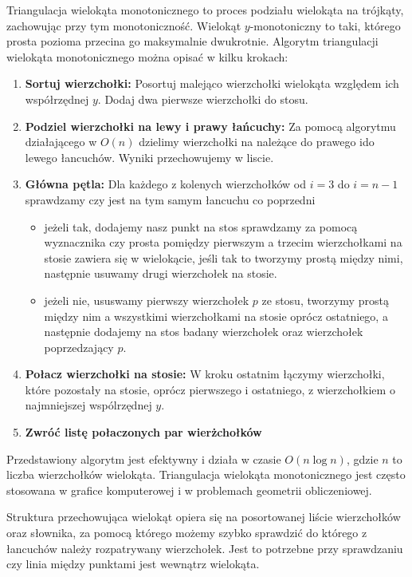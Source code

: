 \quad Triangulacja wielokąta monotonicznego to proces podziału wielokąta na trójkąty, zachowując przy tym monotoniczność. Wielokąt $y$-monotoniczny to taki, którego prosta pozioma przecina go maksymalnie dwukrotnie. Algorytm triangulacji wielokąta monotonicznego można opisać w kilku krokach:

\begin{enumerate}
\item \textbf{Sortuj wierzchołki:} Posortuj malejąco wierzchołki wielokąta względem ich współrzędnej $y$. Dodaj dwa pierwsze wierzchołki do stosu.

\item \textbf{Podziel wierzchołki na lewy i prawy łańcuchy:} Za pomocą algorytmu działającego w $O(n)$ dzielimy wierzchołki na należące do prawego ido lewego łancuchów. 
Wyniki przechowujemy w liscie.

\item \textbf{Główna pętla:} Dla każdego z kolenych wierzchołków od $i = 3$ do $i = n-1$ sprawdzamy czy jest na tym samym łancuchu co poprzedni

\begin{itemize}
    \item jeżeli tak, 
    dodajemy nasz punkt na stos
    sprawdzamy za pomocą wyznacznika czy prosta pomiędzy pierwszym a trzecim wierzchołkami na stosie zawiera się w wielokącie, jeśli tak to tworzymy prostą między nimi, następnie usuwamy drugi wierzchołek na stosie.
    
    
    \item jeżeli nie, 
    ususwamy pierwszy wierzchołek $p$ ze stosu,
    tworzymy prostą między nim a wszystkimi wierzchołkami na stosie oprócz ostatniego, a następnie dodajemy na stos badany wierzchołek oraz wierzchołek poprzedzający $p$.
\end{itemize}

\item \textbf{Połacz wierzchołki na stosie: } W kroku ostatnim łączymy wierzchołki, które pozostały na stosie, oprócz pierwszego i ostatniego, z wierzchołkiem o najmniejszej wspólrzędnej $y$.
\item \textbf{Zwróć listę połaczonych par wierżchołków}

\end{enumerate}


Przedstawiony algorytm jest efektywny i działa w czasie \(O(n \log n)\), gdzie \(n\) to liczba wierzchołków wielokąta. Triangulacja wielokąta monotonicznego jest często stosowana w grafice komputerowej i w problemach geometrii obliczeniowej.

Struktura przechowująca wielokąt opiera się na posortowanej liście wierzchołków oraz słownika, za pomocą którego możemy szybko sprawdzić do którego z łancuchów należy rozpatrywany wierzchołek. 
Jest to potrzebne przy sprawdzaniu czy linia między punktami jest wewnątrz wielokąta.